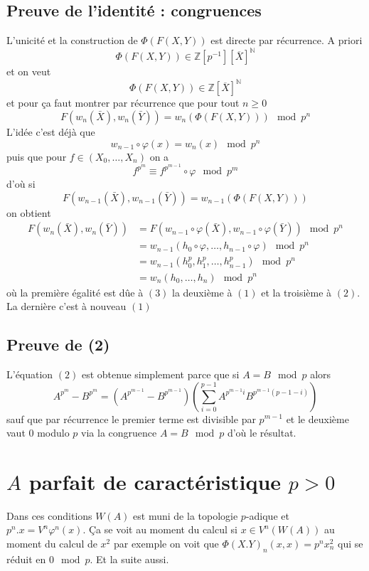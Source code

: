 \documentclass[a4paper,12pt]{article}
\newcommand{\Z}{\mathbb{Z}}
\newcommand{\N}{\mathbb{N}}
\theoremstyle{plain}
\theoremstyle{definition}
\theoremstyle{remark}
\begin{document}
\subsection{Preuve de l'identité : congruences}
L'unicité et la construction de $\Phi(F(X,Y))$ est directe par 
récurrence. A priori 
\[\Phi(F(X,Y))\in \Z[p^{-1}][\overline X]^\N\]
et on veut 
\[\Phi(F(X,Y))\in \Z[\overline X]^\N\]
et pour ça faut montrer par récurrence que pour tout $n\geq 0$
\[F(w_n(\bar X),w_n(\bar Y))=w_n(\Phi(F(X,Y)))\mod p^n\]
L'idée c'est déjà que
\begin{equation}
w_{n-1}\circ\varphi(x)=w_n(x)\mod p^n
\end{equation}
puis que pour $f\in (X_0,\ldots, X_n)$ on a 
\begin{equation}
f^{p^m}\equiv f^{p^{m-1}}\circ\varphi\mod p^m
\end{equation}
d'où si 
\begin{equation}
F(w_{n-1}(\bar X),w_{n-1}(\bar Y))= w_{n-1}(\Phi(F(X,Y)))
\end{equation}
on obtient 
\begin{align*}
  F(w_n(\bar X),w_n(\bar Y))&=F(w_{n-1}\circ\varphi(\bar X),w_{n-1}\circ\varphi(\bar Y))\mod p^n\\
                            &=w_{n-1}(h_0\circ\varphi,\ldots, h_{n-1}\circ\varphi)\mod p^n\\
                            &=w_{n-1}(h_0^p,h_1^p,\ldots, h_{n-1}^p)\mod p^n\\
                            &=w_n(h_0,\ldots, h_n)\mod p^n
\end{align*}
où la première égalité est dûe à $(3)$ la deuxième à $(1)$ et 
la troisième à $(2)$. La dernière c'est à nouveau $(1)$

\subsection{Preuve de (2)}
L'équation $(2)$ est obtenue simplement parce que si 
$A=B\mod p$ alors 
\[A^{p^m}-B^{p^m}=(A^{p^{m-1}}-B^{p^{m-1}})\left(\sum_{i=0}^{p-1} A^{p^{m-1}i}B^{p^{m-1}(p-1-i)}\right)\]
sauf que par récurrence le premier terme est divisible par
$p^{m-1}$ et le deuxième vaut $0$ modulo $p$ via la congruence
$A=B\mod p$ d'où le résultat.


\section{$A$ parfait de caractéristique $p>0$}
Dans ces conditions $W(A)$ est muni de la topologie $p$-adique et
$p^n.x=V^n\varphi^n(x)$. Ça se voit au moment du calcul si 
$x\in V^n(W(A))$ au moment du calcul de $x^2$ par exemple on voit
que $\Phi(X.Y)_n(x,x)=p^nx_n^2$ qui se réduit en $0\mod p$. Et
la suite aussi.
\end{document}
